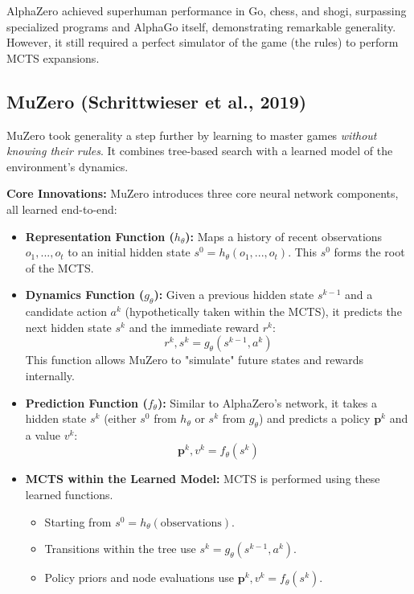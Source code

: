 \documentclass[11pt,a4paper]{article}
\begin{document}
AlphaZero achieved superhuman performance in Go, chess, and shogi, surpassing specialized programs and AlphaGo itself, demonstrating remarkable generality. However, it still required a perfect simulator of the game (the rules) to perform MCTS expansions.

\subsection{MuZero (Schrittwieser et al., 2019)~\cite{muzero}}
MuZero took generality a step further by learning to master games \textit{without knowing their rules}. It combines tree-based search with a learned model of the environment's dynamics.

\textbf{Core Innovations:}
MuZero introduces three core neural network components, all learned end-to-end:
\begin{itemize}
    \item \textbf{Representation Function ($h_{\theta}$):} Maps a history of recent observations $o_1, ..., o_t$ to an initial hidden state $s^0 = h_{\theta}(o_1, ..., o_t)$. This $s^0$ forms the root of the MCTS.
    \item \textbf{Dynamics Function ($g_{\theta}$):} Given a previous hidden state $s^{k-1}$ and a candidate action $a^k$ (hypothetically taken within the MCTS), it predicts the next hidden state $s^k$ and the immediate reward $r^k$:
    \begin{equation}
        r^k, s^k = g_{\theta}(s^{k-1}, a^k)
    \end{equation}
    This function allows MuZero to "simulate" future states and rewards internally.
    \item \textbf{Prediction Function ($f_{\theta}$):} Similar to AlphaZero's network, it takes a hidden state $s^k$ (either $s^0$ from $h_{\theta}$ or $s^k$ from $g_{\theta}$) and predicts a policy $\mathbf{p}^k$ and a value $v^k$:
    \begin{equation}
        \mathbf{p}^k, v^k = f_{\theta}(s^k)
    \end{equation}
    \item \textbf{MCTS within the Learned Model:} MCTS is performed using these learned functions.
    \begin{itemize}
        \item Starting from $s^0=h_{\theta}(\text{observations})$.
        \item Transitions within the tree use $s^k = g_{\theta}(s^{k-1}, a^k)$.
        \item Policy priors and node evaluations use $\mathbf{p}^k, v^k = f_{\theta}(s^k)$.

\end{itemize}
\end{itemize}
\end{document}
